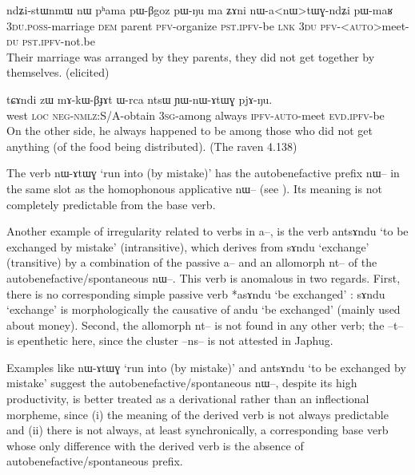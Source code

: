 \documentclass[oldfontcommands,oneside,a4paper,11pt]{article}
\newcommand{\ipa}[1]{{\phon \mbox{#1}}} %
\begin{document}
 \begin{exe}
\ex \label{ex:nanWtWGndZi}
\gll 
\ipa{ndʑi-stɯnmɯ}  	\ipa{nɯ}  	\ipa{pʰama}  	\ipa{pɯ-βgoz}  	\ipa{pɯ-ŋu}  	\ipa{ma}  	\ipa{ʑɤni}  	\ipa{nɯ-a<nɯ>tɯɣ-ndʑi}  	\ipa{pɯ-maʁ}  \\
\textsc{3du.poss}-marriage \textsc{dem} parent \textsc{pfv}-organize \textsc{pst.ipfv}-be \textsc{lnk} \textsc{3du} \textsc{pfv}-<\textsc{auto}>meet-\textsc{du}  \textsc{pst.ipfv}-not.be \\
\glt Their marriage was arranged by they parents, they did not get together by themselves. (elicited)
\end{exe}

 \begin{exe}
\ex \label{ex:YWnAtWG}
\gll 
\ipa{tɕɤndi}  	\ipa{zɯ}  	\ipa{mɤ-kɯ-βɟɤt}  	\ipa{ɯ-rca}  	\ipa{ntsɯ}  	\ipa{ɲɯ-nɯ-ɤtɯɣ}  	\ipa{pjɤ-ŋu.}  \\
west \textsc{loc} \textsc{neg-nmlz}:S/A-obtain \textsc{3sg}-among always \textsc{ipfv-auto}-meet \textsc{evd.ipfv}-be \\
\glt On the other side, he   always happened to be among those who did not get anything (of the food being distributed). (The raven 4.138)
\end{exe}

The verb \ipa{nɯ-ɤtɯɣ}  `run into (by mistake)'  has the autobenefactive prefix \ipa{nɯ--} in the same slot as the homophonous applicative \ipa{nɯ--} (see \citealt{jacques13tropative}). Its meaning   is not completely predictable from the base verb.

Another example of irregularity related to verbs in \ipa{a--}, is the verb \ipa{antsɤndu} `to be exchanged by mistake' (intransitive), which derives from   \ipa{sɤndu} `exchange' (transitive) by a combination of the passive \ipa{a--} and an allomorph \ipa{nt--} of the autobenefactive/spontaneous \ipa{nɯ--}. This verb is anomalous in two regards. First, there is no corresponding simple passive verb *\ipa{asɤndu} `be exchanged' : \ipa{sɤndu} `exchange' is morphologically the causative of \ipa{andu} `be exchanged' (mainly used about money). Second, the allomorph \ipa{nt--} is not found in any other verb; the \ipa{--t--} is epenthetic here, since the cluster \ipa{--ns--} is not attested in Japhug.

Examples like \ipa{nɯ-ɤtɯɣ}  `run into (by mistake)' and \ipa{antsɤndu} `to be exchanged by mistake'   suggest the autobenefactive/spontaneous \ipa{nɯ--}, despite its high productivity, is better treated as a derivational rather than an inflectional morpheme, since (i) the meaning of the derived verb is not always predictable and (ii) there is not always, at least synchronically, a corresponding base verb whose only difference with the derived verb is the absence of autobenefactive/spontaneous prefix.
 
\end{document}
